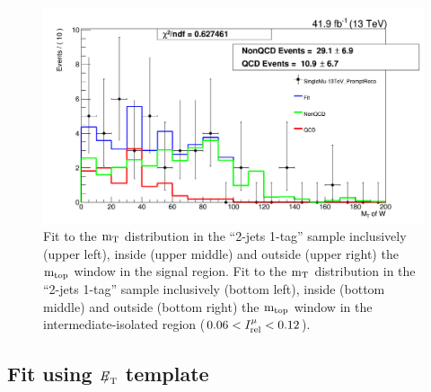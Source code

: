 {\begin{figure}[h!]
{\begin{centering}
\includegraphics[scale=0.2]{figures/2J1T/MTW_fit_2j1t_moreiso_SB_MCnonQCDtemplate}
\par\end{centering}
}
\caption{Fit to the ${\rm m_{T}}$ distribution in the \textquotedblleft{}2-jets
1-tag\textquotedblright{} sample inclusively (upper left), inside
(upper middle) and outside (upper right) the ${\rm m_{top}}$ window in
the signal region. Fit to the ${\rm m_{T}}$ distribution in the
\textquotedblleft{}2-jets 1-tag\textquotedblright{} sample inclusively
(bottom left), inside (bottom middle) and outside (bottom right) the ${\rm m_{top}}$
window in the intermediate-isolated region ($0.06 < I_{\rm rel}^{\mu} < 0.12$). }
\end{figure}

\clearpage

\subsection{Fit using ${E\!\!\!/}_{\mathrm{T}}$ template}

}
